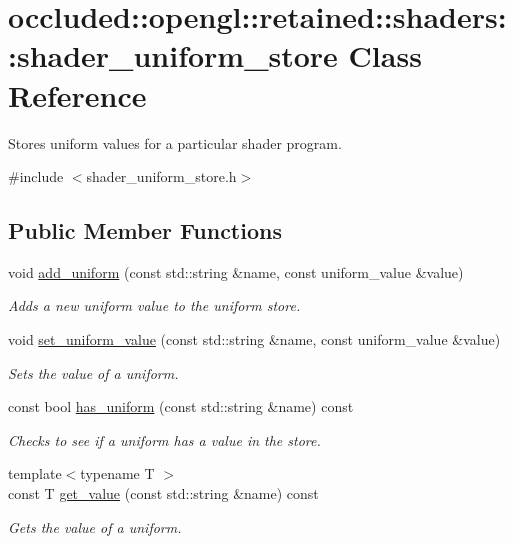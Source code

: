 \hypertarget{classoccluded_1_1opengl_1_1retained_1_1shaders_1_1shader__uniform__store}{\section{occluded\+:\+:opengl\+:\+:retained\+:\+:shaders\+:\+:shader\+\_\+uniform\+\_\+store Class Reference}
\label{classoccluded_1_1opengl_1_1retained_1_1shaders_1_1shader__uniform__store}
}


Stores uniform values for a particular shader program.  




{\ttfamily \#include $<$shader\+\_\+uniform\+\_\+store.\+h$>$}

\subsection*{Public Member Functions}
\begin{DoxyCompactItemize}
\item 
void \hyperlink{classoccluded_1_1opengl_1_1retained_1_1shaders_1_1shader__uniform__store_a3fb24f0d04b2f34c2013f9c272ba662b}{add\+\_\+uniform} (const std\+::string \&name, const uniform\+\_\+value \&value)
\begin{DoxyCompactList}\small\item\em Adds a new uniform value to the uniform store. \end{DoxyCompactList}\item 
void \hyperlink{classoccluded_1_1opengl_1_1retained_1_1shaders_1_1shader__uniform__store_adc43de912769b10941eb93b407d8662d}{set\+\_\+uniform\+\_\+value} (const std\+::string \&name, const uniform\+\_\+value \&value)
\begin{DoxyCompactList}\small\item\em Sets the value of a uniform. \end{DoxyCompactList}\item 
const bool \hyperlink{classoccluded_1_1opengl_1_1retained_1_1shaders_1_1shader__uniform__store_a6d43a547f065e6fdbaa37faab77ef924}{has\+\_\+uniform} (const std\+::string \&name) const 
\begin{DoxyCompactList}\small\item\em Checks to see if a uniform has a value in the store. \end{DoxyCompactList}\item 
{\footnotesize template$<$typename T $>$ }\\const T \hyperlink{classoccluded_1_1opengl_1_1retained_1_1shaders_1_1shader__uniform__store_a69ee4a0dd33e31fcf4ea0e82acf0f2db}{get\+\_\+value} (const std\+::string \&name) const 
\begin{DoxyCompactList}\small\item\em Gets the value of a uniform. \end{DoxyCompactList}\end{DoxyCompactItemize}
